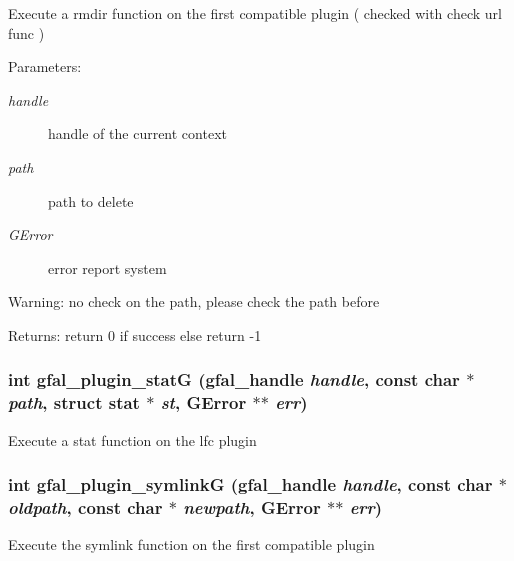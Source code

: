 Execute a rmdir function on the first compatible plugin ( checked with check url func ) \begin{Desc}
\item[Parameters:]
\begin{description}
\item[{\em handle}]handle of the current context \item[{\em path}]path to delete \item[{\em GError}]error report system \end{description}
\end{Desc}
\begin{Desc}
\item[Warning:]no check on the path, please check the path before \end{Desc}
\begin{Desc}
\item[Returns:]return 0 if success else return -1 \end{Desc}
\subsubsection{\setlength{\rightskip}{0pt plus 5cm}int gfal\_\-plugin\_\-stat\-G (gfal\_\-handle {\em handle}, const char $\ast$ {\em path}, struct stat $\ast$ {\em st}, GError $\ast$$\ast$ {\em err})}\label{gfal__common__plugin_8h_98b9e43ecd18ce2fc728d4a731e52ce1}


Execute a stat function on the lfc plugin 
\subsubsection{\setlength{\rightskip}{0pt plus 5cm}int gfal\_\-plugin\_\-symlink\-G (gfal\_\-handle {\em handle}, const char $\ast$ {\em oldpath}, const char $\ast$ {\em newpath}, GError $\ast$$\ast$ {\em err})}\label{gfal__common__plugin_8h_6ff9d39b564be7d0a560a09288e19b9e}


Execute the symlink function on the first compatible plugin 
